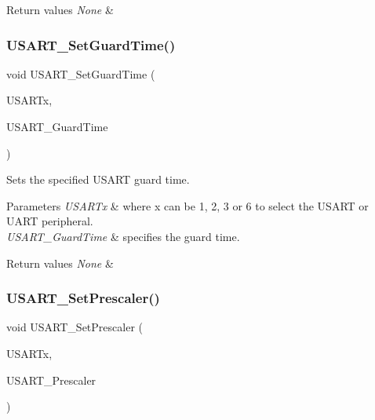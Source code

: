 \begin{DoxyRetVals}{Return values}
{\em None} & \\
\hline
\end{DoxyRetVals}
\mbox{\label{group___u_s_a_r_t_gac4a35c6acd71ae7e0d67c1f03f0a8777}} 
\subsubsection{\texorpdfstring{U\+S\+A\+R\+T\+\_\+\+Set\+Guard\+Time()}{USART\_SetGuardTime()}}
{\footnotesize\ttfamily void U\+S\+A\+R\+T\+\_\+\+Set\+Guard\+Time (\begin{DoxyParamCaption}\item[{U\+S\+A\+R\+T\+\_\+\+Type\+Def $\ast$}]{U\+S\+A\+R\+Tx,  }\item[{uint8\+\_\+t}]{U\+S\+A\+R\+T\+\_\+\+Guard\+Time }\end{DoxyParamCaption})}



Sets the specified U\+S\+A\+RT guard time. 


\begin{DoxyParams}{Parameters}
{\em U\+S\+A\+R\+Tx} & where x can be 1, 2, 3 or 6 to select the U\+S\+A\+RT or U\+A\+RT peripheral. \\
\hline
{\em U\+S\+A\+R\+T\+\_\+\+Guard\+Time} & specifies the guard time. ~\newline
\\
\hline
\end{DoxyParams}

\begin{DoxyRetVals}{Return values}
{\em None} & \\
\hline
\end{DoxyRetVals}
\mbox{\label{group___u_s_a_r_t_gaf5da8f2eee8245425584d85d4f62cc33}} 
\subsubsection{\texorpdfstring{U\+S\+A\+R\+T\+\_\+\+Set\+Prescaler()}{USART\_SetPrescaler()}}
{\footnotesize\ttfamily void U\+S\+A\+R\+T\+\_\+\+Set\+Prescaler (\begin{DoxyParamCaption}\item[{U\+S\+A\+R\+T\+\_\+\+Type\+Def $\ast$}]{U\+S\+A\+R\+Tx,  }\item[{uint8\+\_\+t}]{U\+S\+A\+R\+T\+\_\+\+Prescaler }\end{DoxyParamCaption})}



